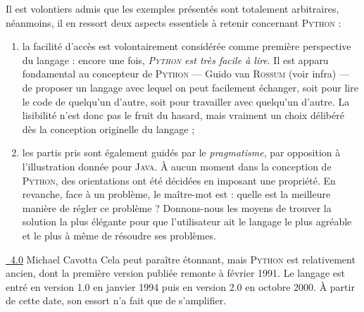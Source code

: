 Il est volontiers admis que les exemples présentés sont totalement arbitraires, néanmoins, il en ressort deux aspects essentiels à retenir concernant \textsc{Python} :
\begin{enumerate}
	\item la facilité d'accès est volontairement considérée comme première perspective du langage : encore une fois, \textit{\textsc{Python} est très facile à lire}. Il est apparu fondamental au concepteur de \textsc{Python} --- Guido van \textsc{Rossum} (voir infra) --- de proposer un langage avec lequel on peut facilement échanger, soit pour lire le code de quelqu'un d'autre, soit pour travailler avec quelqu'un d'autre. La lisibilité n'est donc pas le fruit du hasard, mais vraiment un choix délibé\-ré dès la conception originelle du langage ;
	\item les partis pris sont également guidés par le \emph{pragmatisme}, par opposition à l'illustration donnée pour \textsc{Java}. À aucun moment dans la conception de \textsc{Python}, des orientations ont été décidées en imposant une propriété. En revanche, face à un problème, le maître-mot est : quelle est la meilleure manière de régler ce problème ? Donnons-nous les moyens de trouver la solution la plus élégante pour que l'utilisateur ait le langage le plus agréable et le plus à même de résoudre ses problèmes.
\end{enumerate}



%
{\href{https://creativecommons.org/licenses/by-nc-nd/4.0/}{\ccbyncndeu\ 4.0} Michael Cavotta}%
Cela peut paraître étonnant, mais \textsc{Python} est relativement ancien, dont la première version publiée remonte à février 1991. Le langage est entré en version 1.0 en janvier 1994 puis en version 2.0 en octobre 2000. À partir de cette date, son essort n'a fait que de s'amplifier.

